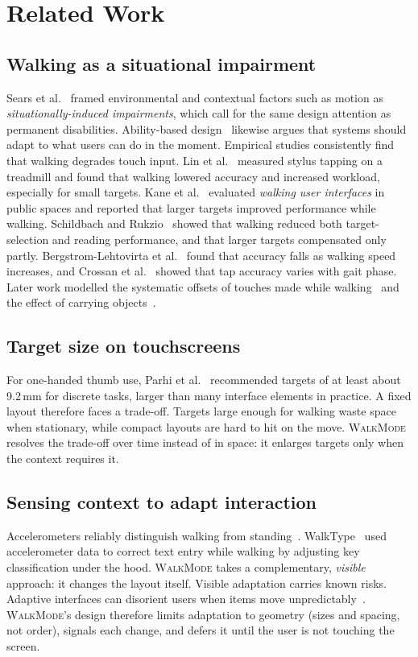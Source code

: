 \documentclass[sigconf,nonacm]{acmart}
\newcommand{\WM}{\textsc{WalkMode}}
\begin{document}
\section{Related Work}

\subsection{Walking as a situational impairment}
Sears et al.~\cite{sears2003fade} framed environmental and contextual factors such as motion as \emph{situationally-induced impairments}, which call for the same design attention as permanent disabilities. Ability-based design~\cite{wobbrock2011ability} likewise argues that systems should adapt to what users can do in the moment. Empirical studies consistently find that walking degrades touch input. Lin et al.~\cite{lin2007tap} measured stylus tapping on a treadmill and found that walking lowered accuracy and increased workload, especially for small targets. Kane et al.~\cite{kane2008walking} evaluated \emph{walking user interfaces} in public spaces and reported that larger targets improved performance while walking. Schildbach and Rukzio~\cite{schildbach2010walking} showed that walking reduced both target-selection and reading performance, and that larger targets compensated only partly. Bergstrom-Lehtovirta et al.~\cite{bergstrom2011speed} found that accuracy falls as walking speed increases, and Crossan et al.~\cite{crossan2005gait} showed that tap accuracy varies with gait phase. Later work modelled the systematic offsets of touches made while walking~\cite{music2016nomadic} and the effect of carrying objects~\cite{ng2014encumbrance}.

\subsection{Target size on touchscreens}
For one-handed thumb use, Parhi et al.~\cite{parhi2006target} recommended targets of at least about 9.2\,mm for discrete tasks, larger than many interface elements in practice. A fixed layout therefore faces a trade-off. Targets large enough for walking waste space when stationary, while compact layouts are hard to hit on the move. \WM{} resolves the trade-off over time instead of in space: it enlarges targets only when the context requires it.

\subsection{Sensing context to adapt interaction}
Accelerometers reliably distinguish walking from standing~\cite{kwapisz2011activity}. WalkType~\cite{goel2012walktype} used accelerometer data to correct text entry while walking by adjusting key classification under the hood. \WM{} takes a complementary, \emph{visible} approach: it changes the layout itself. Visible adaptation carries known risks. Adaptive interfaces can disorient users when items move unpredictably~\cite{findlater2004menus,gajos2006adaptive}. \WM{}'s design therefore limits adaptation to geometry (sizes and spacing, not order), signals each change, and defers it until the user is not touching the screen.
\end{document}
